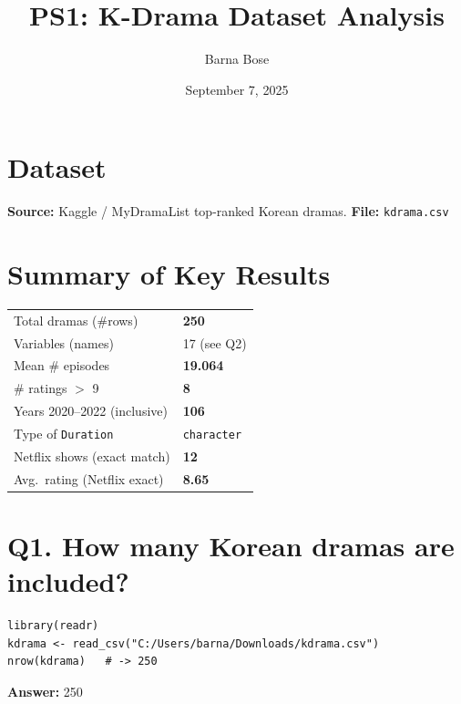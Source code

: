 \documentclass[11pt]{article}
\title{PS1: K-Drama Dataset Analysis}
\author{Barna Bose}
\date{September 7, 2025}
\begin{document}
\maketitle

\section*{Dataset}
\textbf{Source:} Kaggle / MyDramaList top-ranked Korean dramas.  
\textbf{File:} \texttt{kdrama.csv}

\bigskip

\section*{Summary of Key Results}
\begin{center}
\begin{tabular}{@{}ll@{}}
\toprule
Total dramas (\#rows) & \textbf{250} \\
Variables (names) & 17 (see Q2) \\
Mean \# episodes & \textbf{19.064} \\
\# ratings $>$ 9 & \textbf{8} \\
Years 2020--2022 (inclusive) & \textbf{106} \\
Type of \texttt{Duration} & \texttt{character} \\
Netflix shows (exact match) & \textbf{12} \\
Avg.\ rating (Netflix exact) & \textbf{8.65} \\
\bottomrule
\end{tabular}
\end{center}

\section*{Q1. How many Korean dramas are included?}
\begin{lstlisting}
library(readr)
kdrama <- read_csv("C:/Users/barna/Downloads/kdrama.csv")
nrow(kdrama)   # -> 250
\end{lstlisting}
\textbf{Answer:} 250

\end{document}
